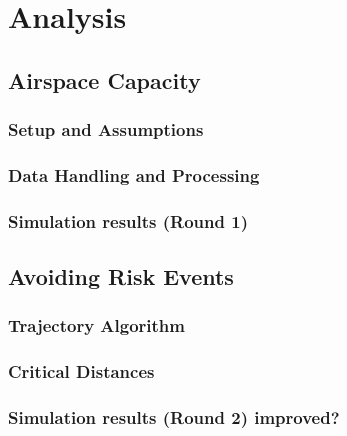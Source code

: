 \documentclass[UKenglish]{beamer}
\begin{document}
\section{Analysis}
\subsection{Airspace Capacity}
\subsubsection{Setup and Assumptions}
\subsubsection{Data Handling and Processing}
\subsubsection{Simulation results (Round 1)}
\subsection{Avoiding Risk Events}
\subsubsection{Trajectory Algorithm}
\subsubsection{Critical Distances}
\subsubsection{Simulation results (Round 2) improved?}
\end{document}
